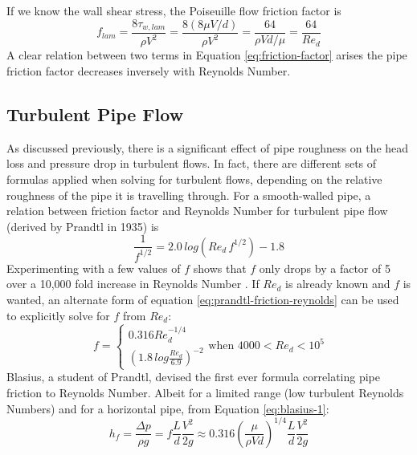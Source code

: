 \documentclass[9pt]{article} %
\numberwithin{equation}{section} %
\begin{document}
\begin{multicols}{2}
If we know the wall shear stress, the Poiseuille flow friction factor is
\begin{equation} \label{eq:friction-factor}
f_{lam} = \frac{8 \tau_{w, lam}}{\rho V^{2}} = \frac{8(8 \mu V/d)}{\rho V^{2}} = \frac{64}{\rho V d/\mu} = \frac{64}{Re_{d}}
\end{equation}	
A clear relation between two terms in Equation \ref{eq:friction-factor} arises \textemdash{} the pipe friction factor decreases inversely with Reynolds Number.
\subsection{Turbulent Pipe Flow}

As discussed previously, there is a significant effect of pipe roughness on the head loss and pressure drop in turbulent flows. In fact, there are different sets of formulas applied when solving for turbulent flows, depending on the relative roughness of the pipe it is travelling through. For a smooth-walled pipe, a relation between friction factor and Reynolds Number for turbulent pipe flow (derived by Prandtl in 1935) is \cite{fluid-mechanics}
\begin{equation} \label{eq:prandtl-friction-reynolds}
\frac{1}{f^{1/2}} = 2.0\, log({Re_{d}\, f^{1/2}}) - 1.8
\end{equation}
Experimenting with a few values of $f$ shows that $f$ only drops by a factor of 5 over a 10,000 fold increase in Reynolds Number \cite{fluid-mechanics}. If $Re_{d}$ is already known and $f$ is wanted, an alternate form of equation \ref{eq:prandtl-friction-reynolds} can be used to explicitly solve for $f$ from $Re_{d}$:
\begin{equation} \label{eq:blasius-1}
f = 
\begin{cases}
0.316 Re_{d}^{-1/4}\\%
\left( 1.8\, log \frac{Re_{d}}{6.9} \right)^{-2}%
\end{cases}
\text{when } 4000 < Re_{d} < 10^{5}
\end{equation}
Blasius, a student of Prandtl, devised the first ever formula correlating pipe friction to Reynolds Number. Albeit for a limited range (low turbulent Reynolds Numbers) and for a horizontal pipe, from Equation \ref{eq:blasius-1}:
\begin{equation} \label{eq:blasius-2}
h_{f} = \frac{\Delta p}{\rho g} = f \frac{L}{d} \frac{V^{2}}{2g} \approx 0.316 \left( \frac{\mu}{\rho V d} \right)^{1/4} \frac{L}{d} \frac{V^{2}}{2g}

\end{equation}
\end{multicols}
\end{document}
